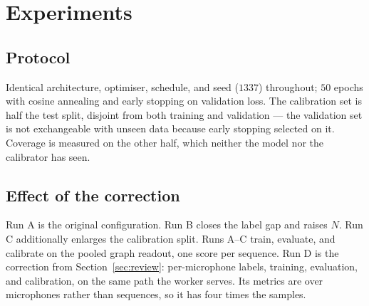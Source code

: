 \documentclass[11pt]{article}
\let\oldsection\section
\renewcommand{\section}{\clearpage\oldsection}
\begin{document}
\section{Experiments}
\label{sec:experiments}

\subsection{Protocol}

Identical architecture, optimiser, schedule, and seed ($1337$) throughout; $50$
epochs with cosine annealing and early stopping on validation loss. The
calibration set is half the test split, disjoint from both training and
validation --- the validation set is not exchangeable with unseen data because
early stopping selected on it. Coverage is measured on the other half, which
neither the model nor the calibrator has seen.

\subsection{Effect of the correction}

Run A is the original configuration. Run B closes the label gap and raises $N$.
Run C additionally enlarges the calibration split. Runs A--C train, evaluate,
and calibrate on the pooled graph readout, one score per sequence. Run D is the
correction from Section~\ref{sec:review}: per-microphone labels, training,
evaluation, and calibration, on the same path the worker serves. Its metrics
are over microphones rather than sequences, so it has four times the samples.
\end{document}
